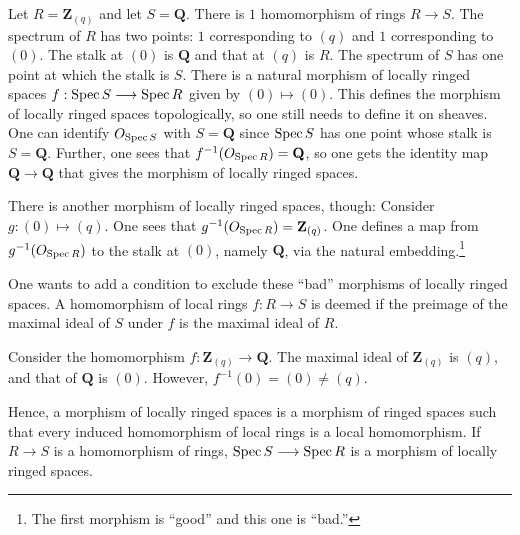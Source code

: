 \documentclass [11 pt, oneside] {article}
\begin{document}
\begin{example}[ ]\label{}\text{}
Let $R= \mathbf{Z}_{(q)}$ and let $S=\mathbf{Q}$. There is $1$ homomorphism of rings $R\longrightarrow S$. The spectrum of $R$ has two points: $1$ corresponding to $(q)$ and $1$ corresponding to $ (0)$. The stalk at $(0)$ is $\mathbf{Q}$ and that at $(q)$ is $R$. The spectrum of $S$ has one point at which the stalk is $S$. There is a natural morphism of locally ringed spaces $f:\operatorname{Spec} S \longrightarrow \operatorname{Spec} R$ given by $(0)\longmapsto  (0)$. This defines the morphism of locally ringed spaces topologically, so one still needs to define it on sheaves. One can identify $\relax{O}_{\operatorname{Spec} S}$ with $S=\mathbf{Q}$ since $\operatorname{Spec} S$ has one point whose stalk is $S=\mathbf{Q}$. Further, one sees that $f^{-1}(\relax{O}_{\operatorname{Spec} R})= \mathbf{Q}$, so one gets the identity map $\mathbf{Q}\longrightarrow \mathbf{Q}$ that gives the morphism of locally ringed spaces.

There is another morphism of locally ringed spaces, though: Consider $g:(0)\longmapsto  (q)$. One sees that $g^{-1}(\relax{O}_{\operatorname{Spec} R})= \mathbf{Z}_{(q)}$. One defines a map from $g^{-1}(\relax{O}_{\operatorname{Spec} R})$ to the stalk at $(0)$, namely $\mathbf{Q}$, via the natural embedding.\footnote{The first morphism is ``good'' and this one is ``bad.''} 
\end{example}

One wants to add a condition to exclude these ``bad'' morphisms of locally ringed spaces. A homomorphism of local rings $f:R\longrightarrow S$ is deemed  if the preimage of the maximal ideal of $S$ under $f$ is the maximal ideal of $R$.

\begin{example}\label{}\text{}
Consider the homomorphism $f:\mathbf{Z}_{(q)} \longrightarrow \mathbf{Q}$. The maximal ideal of $ \mathbf{Z}_{(q)}$ is $(q)$, and that of $\mathbf{Q}$ is $(0)$. However, $f^{-1}(0)=  (0)\ne  (q)$. 
\end{example}

Hence, a morphism of locally ringed spaces is a morphism of ringed spaces such that every induced homomorphism of local rings is a local homomorphism. If $R\longrightarrow S$ is a homomorphism of rings, $\operatorname{Spec} S\longrightarrow \operatorname{Spec} R$ is a morphism of locally ringed spaces.
\end{document}
